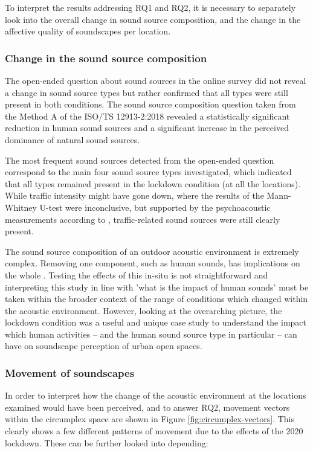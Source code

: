    To interpret the results addressing RQ1 and RQ2, it is necessary to separately look into the overall change in sound source composition, and the change in the affective quality of soundscapes per location.

   \subsubsection{Change in the sound source composition}

   The open-ended question about sound sources in the online survey did not reveal a change in sound source types but rather confirmed that all types were still present in both conditions. The sound source composition question taken from the Method A of the ISO/TS 12913-2:2018 \citep{ISO12913_2_2018IOS} revealed a statistically significant reduction in human sound sources and a significant increase in the perceived dominance of natural sound sources.

   The most frequent sound sources detected from the open-ended question correspond to the main four sound source types investigated, which indicated that all types remained present in the lockdown condition (at all the locations). While traffic intensity might have gone down, where the results of the Mann-Whitney U-test were inconclusive, but supported by the psychoacoustic measurements according to \citet{Aletta2020Assessing}, traffic-related sound sources were still clearly present.

   The sound source composition of an outdoor acoustic environment is extremely complex. Removing one component, such as human sounds, has implications on the whole \citep{Gordo2021Rapid}. Testing the effects of this in-situ is not straightforward and interpreting this study in line with 'what is the impact of human sounds' must be taken within the broader context of the range of conditions which changed within the acoustic environment. However, looking at the overarching picture, the lockdown condition was a useful and unique case study to understand the impact which human activities -- and the human sound source type in particular -- can have on soundscape perception of urban open spaces.

   \subsubsection{Movement of soundscapes}

   In order to interpret how the change of the acoustic environment at the locations examined would have been perceived, and to answer RQ2, movement vectors within the circumplex space are shown in Figure \ref{fig:circumplex-vectors}. This clearly shows a few different patterns of movement due to the effects of the 2020 lockdown. These can be further looked into depending:

